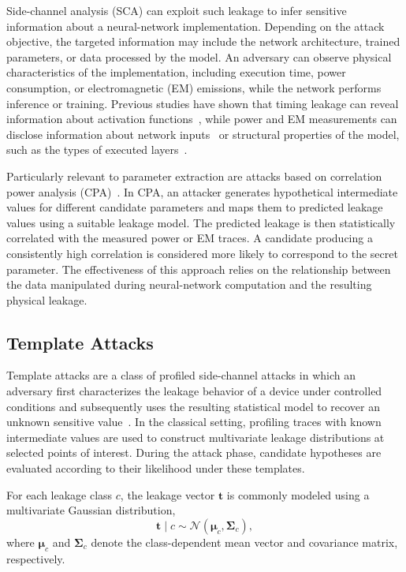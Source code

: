 \documentclass[conference]{IEEEtran}
\begin{document}
Side-channel analysis (SCA) can exploit such leakage to infer sensitive information about a neural-network implementation.
Depending on the attack objective, the targeted information may include the network architecture, trained parameters, or data processed by the model.
An adversary can observe physical characteristics of the implementation, including execution time, power consumption, or electromagnetic (EM) emissions, while the network performs inference or training.
Previous studies have shown that timing leakage can reveal information about activation functions~\cite{batina2019csi}, while power and EM measurements can disclose information about network inputs~\cite{batina2019poster} or structural properties of the model, such as the types of executed layers~\cite{yan2023mercury}.

Particularly relevant to parameter extraction are attacks based on correlation power analysis (CPA)~\cite{batina2019csi,puvskavc2025make,lehocky2025side}.
In CPA, an attacker generates hypothetical intermediate values for different candidate parameters and maps them to predicted leakage values using a suitable leakage model.
The predicted leakage is then statistically correlated with the measured power or EM traces.
A candidate producing a consistently high correlation is considered more likely to correspond to the secret parameter.
The effectiveness of this approach relies on the relationship between the data manipulated during neural-network computation and the resulting physical leakage.

\subsection{Template Attacks}
\label{sec:template-attacks}

Template attacks are a class of profiled side-channel attacks in which an adversary first characterizes the leakage behavior of a device under controlled conditions and subsequently uses the resulting statistical model to recover an unknown sensitive value~\cite{chari2002template}.
In the classical setting, profiling traces with known intermediate values are used to construct multivariate leakage distributions at selected points of interest.
During the attack phase, candidate hypotheses are evaluated according to their likelihood under these templates.

For each leakage class $c$, the leakage vector $\mathbf{t}$ is commonly modeled using a multivariate Gaussian distribution,
\begin{equation*}
	\mathbf{t} \mid c
	\sim
	\mathcal{N}
	\left(
	\boldsymbol{\mu}_c,
	\boldsymbol{\Sigma}_c
	\right),
\end{equation*}
where $\boldsymbol{\mu}_c$ and $\boldsymbol{\Sigma}_c$ denote the class-dependent mean vector and covariance matrix, respectively.
\end{document}
